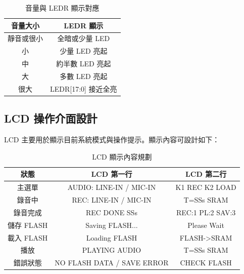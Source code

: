\begin{table}[H]
\centering
\caption{音量與 LEDR 顯示對應}
\begin{tabular}{cc}
\toprule
音量大小 & LEDR 顯示 \\
\midrule
靜音或很小 & 全暗或少量 LED \\
小 & 少量 LED 亮起 \\
中 & 約半數 LED 亮起 \\
大 & 多數 LED 亮起 \\
很大 & LEDR[17:0] 接近全亮 \\
\bottomrule
\end{tabular}
\end{table}

\subsection{LCD 操作介面設計}

LCD 主要用於顯示目前系統模式與操作提示。顯示內容可設計如下：

\begin{table}[H]
\centering
\caption{LCD 顯示內容規劃}
\begin{tabular}{ccc}
\toprule
狀態 & LCD 第一行 & LCD 第二行 \\
\midrule
主選單 & AUDIO: LINE-IN / MIC-IN & K1 REC K2 LOAD \\
錄音中 & REC: LINE-IN / MIC-IN & T=SSs SRAM \\
錄音完成 & REC DONE SSs & REC:1 PL:2 SAV:3 \\
儲存 FLASH & Saving FLASH... & Please Wait \\
載入 FLASH & Loading FLASH & FLASH->SRAM \\
播放 & PLAYING AUDIO & T=SSs SRAM \\
錯誤狀態 & NO FLASH DATA / SAVE ERROR & CHECK FLASH \\
\bottomrule
\end{tabular}
\end{table}




